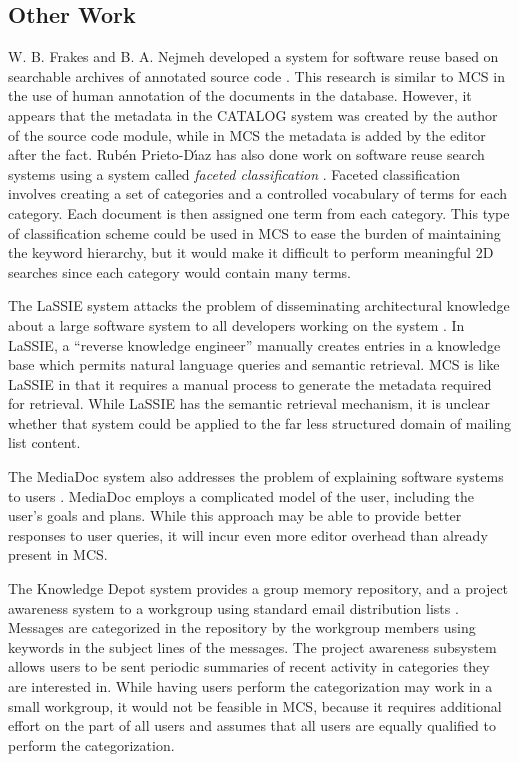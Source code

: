 \subsection{Other Work}
W. B. Frakes and B. A. Nejmeh developed a system for software reuse based on
searchable archives of annotated source code \cite{frakes-87}. This research is
similar to MCS in the use of human annotation of the documents in the database.
However, it appears that the metadata in the CATALOG system was created by the
author of the source code module, while in MCS the metadata is added by the
editor after the fact. Rub\'{e}n Prieto-D\'{\i}az has also done work on
software reuse search systems using a system called {\em faceted
  classification} \cite{diaz-91}. Faceted classification involves creating a
set of categories and a controlled vocabulary of terms for each category. Each
document is then assigned one term from each category. This type of
classification scheme could be used in MCS to ease the burden of maintaining
the keyword hierarchy, but it would make it difficult to perform meaningful 2D
searches since each category would contain many terms.

The LaSSIE system attacks the problem of disseminating architectural knowledge
about a large software system to all developers working on the system
\cite{lassie-91}. In LaSSIE, a ``reverse knowledge engineer'' manually creates
entries in a knowledge base which permits natural language queries and semantic
retrieval. MCS is like LaSSIE in that it requires a manual process to generate
the metadata required for retrieval. While LaSSIE has the semantic retrieval
mechanism, it is unclear whether that system could be applied to the far less
structured domain of mailing list content.

The MediaDoc system also addresses the problem of explaining software systems
to users \cite{1998:ase:erdem}. MediaDoc employs a complicated model of the
user, including the user's goals and plans. While this approach may be able to
provide better responses to user queries, it will incur even more editor
overhead than already present in MCS.

The Knowledge Depot system provides a group memory repository, and a project
awareness system to a workgroup using standard email distribution lists
\cite{knowledge-depot}. Messages are categorized in the repository by the
workgroup members using keywords in the subject lines of the messages. The
project awareness subsystem allows users to be sent periodic summaries of
recent activity in categories they are interested in. While having users
perform the categorization may work in a small workgroup, it would not be
feasible in MCS, because it requires additional effort on the part of all users
and assumes that all users are equally qualified to perform the categorization.

